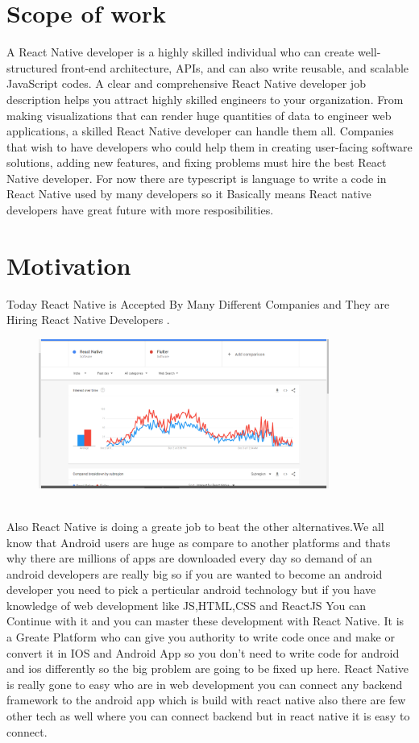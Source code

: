 \documentclass[12pt,a4paper]{report}
\begin{document}
\section{Scope of work}
\hspace{0.5cm} A React Native developer is a highly skilled individual who can create well-structured front-end architecture, APIs, and can also write reusable, and scalable JavaScript codes. A clear and comprehensive React Native developer job description helps you attract highly skilled engineers to your organization. From making visualizations that can render huge quantities of data to engineer web applications, a skilled React Native developer can handle them all. Companies that wish to have developers who could help them in creating user-facing software solutions, adding new features, and fixing problems must hire the best React Native developer. For now there are typescript is language to write a code in React Native used by many developers so it Basically means React native developers have great future with more resposibilities.




\section{Motivation}
\hspace{0.5cm} Today React Native is Accepted By Many Different Companies and They are Hiring React Native Developers . \\
\begin{figure}[h]
    \centering
    \includegraphics[width=0.85\textwidth]{react_trends}
\end{figure}
\\
Also React Native is doing a greate job to beat the other alternatives.We all know that Android users are huge as compare to another platforms and thats why there are millions of apps are downloaded every day so demand of an android developers are really big so if you are wanted to become an android developer you need to pick a perticular android technology but if you have knowledge of web development like JS,HTML,CSS and ReactJS You can Continue with it and you can master these development with React Native. It is a Greate Platform who can give you authority to write code once and make or convert it in IOS and Android App so you don't need to write code for android and ios differently so the big problem are going to be fixed up here. React Native is really gone to easy who are in web development you can connect any backend framework to the android app which is build with react native also there are few other tech as well where you can connect backend but in react native it is easy to connect.
\end{document}
